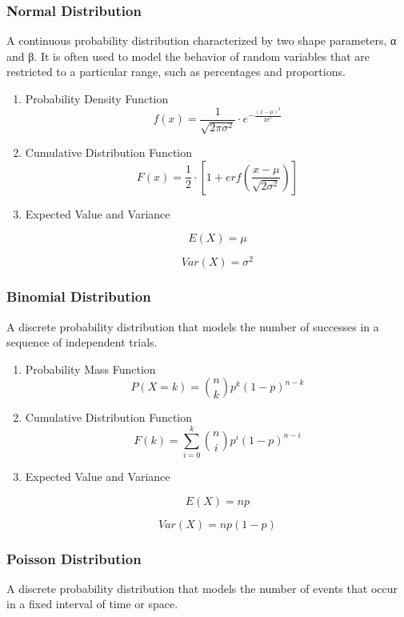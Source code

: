 \documentclass[11pt]{article}
\def\cheatsheetitemsep{-0.5em}
\let\olditem\item
\def\item{\vspace{\cheatsheetitemsep}\olditem}
\begin{document}
\subsubsection{Normal Distribution}
\label{sec:org3578859}
A continuous probability distribution characterized by two shape parameters, α and β. It is often used to model the behavior of random variables that are restricted to a particular range, such as percentages and proportions.

\begin{enumerate}
\item Probability Density Function
\label{sec:orgefa0c9d}
\[
f(x) = \frac{1}{\sqrt{2 \pi \sigma^2}} \cdot e^{-\frac{(x - \mu)^2}{2 \sigma^2}}
\]

\item Cumulative Distribution Function
\label{sec:org290f6b4}
\[
F(x) = \frac{1}{2} \cdot \left[1 + erf\left(\frac{x - \mu}{\sqrt{2 \sigma^2}}\right)\right]
\]

\item Expected Value and Variance
\label{sec:org537bc7f}

\[
E(X) = \mu
\]

\[
Var(X) = \sigma^2
\]
\end{enumerate}


\subsubsection{Binomial Distribution}
\label{sec:orgb17d8a6}
A discrete probability distribution that models the number of successes in a sequence of independent trials.

\begin{enumerate}
\item Probability Mass Function
\label{sec:orgc6ce761}
\[
P(X=k) = \binom{n}{k} p^k (1-p)^{n-k}
\]

\item Cumulative Distribution Function
\label{sec:org82a71c0}
\[
F(k) = \sum_{i=0}^k \binom{n}{i} p^i (1-p)^{n-i}
\]

\item Expected Value and Variance
\label{sec:org0058c9f}

\[
E(X) = np
\]

\[
Var(X) = np(1-p)
\]
\end{enumerate}



\subsubsection{Poisson Distribution}
\label{sec:org4dd32de}
A discrete probability distribution that models the number of events that occur in a fixed interval of time or space.
\end{document}
